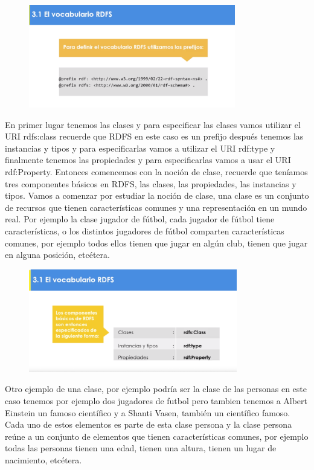 \begin{figure}[H]
	\centering
	\includegraphics[height=4.5cm]{imagenes/capitulo3/22} 
	\caption{}
	\label{}
\end{figure}

En primer lugar tenemos las clases y para especificar las clases vamos utilizar el URI rdfs:class recuerde que RDFS en este caso es un prefijo después tenemos las instancias y tipos y para especificarlas vamos a utilizar el URI rdf:type y finalmente tenemos las propiedades y para especificarlas vamos a usar el URI rdf:Property. Entonces comencemos con la noción de clase, recuerde que teníamos tres componentes básicos en RDFS, las clases, las propiedades, las instancias y tipos. Vamos a comenzar por estudiar la noción de clase, una clase es un conjunto de recursos que tienen características comunes y una representación en un mundo real. Por ejemplo la clase jugador de fútbol, cada jugador de fútbol tiene características, o los distintos jugadores de fútbol comparten características comunes, por ejemplo todos ellos tienen que jugar en algún club, tienen que jugar en alguna posición, etcétera.

\begin{figure}[H]
	\centering
	\includegraphics[height=4.5cm]{imagenes/capitulo3/23} 
	\caption{}
	\label{}
\end{figure}

Otro ejemplo de una clase, por ejemplo podría ser la clase de las personas en este caso tenemos por ejemplo dos jugadores de futbol pero tambien tenemos a Albert Einstein un famoso científico y a Shanti Vasen, también un científico famoso. Cada uno de estos elementos es parte de esta clase persona y la clase persona reúne a un conjunto de elementos que tienen características comunes, por ejemplo todas las personas tienen una edad, tienen una altura, tienen un lugar de nacimiento, etcétera.

